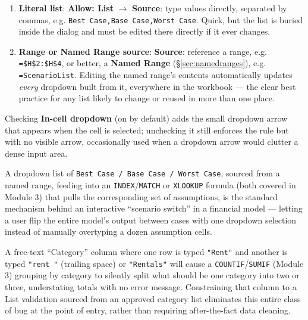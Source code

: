 \documentclass[11pt,a4paper]{article}
\begin{document}
\begin{formulasyntax}
\begin{enumerate}
  \item \textbf{Literal list}: \textbf{Allow: List} $\rightarrow$ \textbf{Source}: type values directly, separated by commas, e.g. \texttt{Best Case,Base Case,Worst Case}. Quick, but the list is buried inside the dialog and must be edited there directly if it ever changes.
  \item \textbf{Range or Named Range source}: \textbf{Source}: reference a range, e.g. \texttt{=\$H\$2:\$H\$4}, or better, a \textbf{Named Range} (\S\ref{sec:namedranges}), e.g. \texttt{=ScenarioList}. Editing the named range's contents automatically updates \emph{every} dropdown built from it, everywhere in the workbook --- the clear best practice for any list likely to change or reused in more than one place.
\end{enumerate}
Checking \textbf{In-cell dropdown} (on by default) adds the small dropdown arrow that appears when the cell is selected; unchecking it still enforces the rule but with no visible arrow, occasionally used when a dropdown arrow would clutter a dense input area.
\end{formulasyntax}

\begin{financeapp}
A dropdown list of \texttt{Best Case / Base Case / Worst Case}, sourced from a named range, feeding into an \texttt{INDEX}/\texttt{MATCH} or \texttt{XLOOKUP} formula (both covered in Module 3) that pulls the corresponding set of assumptions, is the standard mechanism behind an interactive ``scenario switch'' in a financial model --- letting a user flip the entire model's output between cases with one dropdown selection instead of manually overtyping a dozen assumption cells.
\end{financeapp}

\begin{financeapp}
A free-text ``Category'' column where one row is typed \texttt{"Rent"} and another is typed \texttt{"rent "} (trailing space) or \texttt{"Rentals"} will cause a \texttt{COUNTIF}/\texttt{SUMIF} (Module 3) grouping by category to silently split what should be one category into two or three, understating totals with no error message. Constraining that column to a List validation sourced from an approved category list eliminates this entire class of bug at the point of entry, rather than requiring after-the-fact data cleaning.
\end{financeapp}
\end{document}
